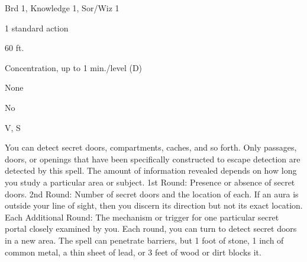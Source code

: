 
\begin{description*}
\item[Level:] Brd 1, Knowledge 1, Sor/Wiz 1
\item[Casting Time:] 1 standard action
\item[Range:] 60 ft.
\item[Duration:] Concentration, up to 1 min./level (D)
\item[Saving Throw:] None
\item[Spell Resistance:] No
\item[Components:] V, S
\end{description*}

You can detect secret doors, compartments, caches, and so forth. Only passages,
doors, or openings that have been specifically constructed to escape detection
are detected by this spell. The amount of information revealed depends on how long
you study a particular area or subject.
1st Round: Presence or absence of secret doors.
2nd Round: Number of secret doors and the location of each. If an aura
is outside your line of sight, then you discern its direction but not its exact
location.
Each Additional Round: The mechanism or trigger for one particular secret
portal closely examined by you. Each round, you can turn to detect secret doors
in a new area. The spell can penetrate barriers, but 1 foot of stone, 1 inch of
common metal, a thin sheet of lead, or 3 feet of wood or dirt blocks it.